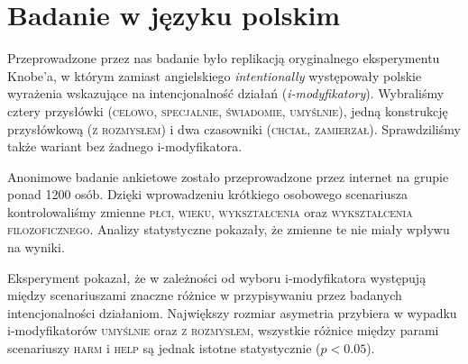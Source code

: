 \documentclass[a4paper]{tufte-handout}
\begin{document}
\section{Badanie w języku polskim}\label{sec:page-layout}
Przeprowadzone przez nas badanie było replikacją oryginalnego eksperymentu Knobe'a, w którym zamiast angielskiego \textit{intentionally} występowały polskie wyrażenia wskazujące na intencjonalność działań (\textit{i-modyfikatory}). Wybraliśmy cztery przysłówki (\textsc{celowo}, \textsc{specjalnie}, \textsc{świadomie}, \textsc{umyślnie}), jedną konstrukcję przysłówkową (\textsc{z rozmysłem}) i dwa czasowniki (\textsc{chciał}, \textsc{zamierzał}). Sprawdziliśmy także wariant bez żadnego i-modyfikatora.


Anonimowe badanie ankietowe zostało przeprowadzone przez internet na grupie ponad 1200 osób. Dzięki wprowadzeniu krótkiego osobowego scenariusza kontrolowaliśmy zmienne \textsc{płci}, \textsc{wieku}, \textsc{wykształcenia} oraz \textsc{wykształcenia filozoficznego}. Analizy statystyczne pokazały, że zmienne te nie miały wpływu na wyniki. 


Eksperyment pokazał, że w zależności od wyboru i-modyfikatora występują między scenariuszami znaczne różnice w przypisywaniu przez badanych intencjonalności działaniom. Największy rozmiar asymetria przybiera w wypadku i-modyfikatorów \textsc{umyślnie} oraz \textsc{z rozmysłem}, wszystkie różnice między parami scenariuszy \textsc{harm} i \textsc{help} są jednak istotne statystycznie ($p < 0.05$). 
\end{document}
